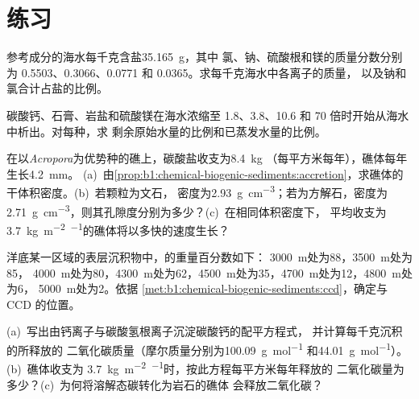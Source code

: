 \section{练习}

\begin{exercise}[$\star$]\label{exo:b1:chemical-biogenic-sediments:1}
参考成分的海水每千克含盐\qty{35.165}{g}，其中
氯、钠、硫酸根和镁的质量分数分别为
0.5503、0.3066、0.0771 和 0.0365。求每千克海水中各离子的质量，
以及钠和氯合计占盐的比例。
\end{exercise}

\begin{exercise}[$\star$]\label{exo:b1:chemical-biogenic-sediments:2}
碳酸钙、石膏、岩盐和硫酸镁在海水浓缩至
1.8、3.8、10.6 和 70 倍时开始从海水中析出。对每种，求
剩余原始水量的比例和已蒸发水量的比例。
\end{exercise}

\begin{exercise}[$\star$]\label{exo:b1:chemical-biogenic-sediments:3}
在以\emph{Acropora}为优势种的礁上，碳酸盐收支为\qty{8.4}{kg}
（每平方米每年），礁体每年生长\qty{4.2}{mm}。
(a)~由\cref{prop:b1:chemical-biogenic-sediments:accretion}，求礁体的
干体积密度。(b)~若颗粒为文石，
密度为\qty{2.93}{g.cm^{-3}}；若为方解石，密度为
\qty{2.71}{g.cm^{-3}}，则其孔隙度分别为多少？(c)~在相同体积密度下，
平均收支为\qty{3.7}{kg.m^{-2}.^{-1}}的礁体将以多快的速度生长？
\end{exercise}

\begin{exercise}[$\star$]\label{exo:b1:chemical-biogenic-sediments:4}
洋底某一区域的表层沉积物中，的重量百分数如下：
\qty{3000}{m}处为88，\qty{3500}{m}处为85，
\qty{4000}{m}处为80，\qty{4300}{m}处为62，\qty{4500}{m}处为35，\qty{4700}{m}处为12，\qty{4800}{m}处为6，
\qty{5000}{m}处为2。依据
\cref{met:b1:chemical-biogenic-sediments:ccd}，确定与 CCD 的位置。
\end{exercise}

\begin{exercise}[$\star\star$]\label{exo:b1:chemical-biogenic-sediments:5}
(a)~写出由钙离子与碳酸氢根离子沉淀碳酸钙的配平方程式，
并计算每千克沉积的所释放的
二氧化碳质量（摩尔质量分别为\qty{100.09}{g.mol^{-1}}
和\qty{44.01}{g.mol^{-1}}）。(b)~礁体收支为
\qty{3.7}{kg.m^{-2}.^{-1}}时，按此方程每平方米每年释放的
二氧化碳量为多少？(c)~为何将溶解态碳转化为岩石的礁体
会释放二氧化碳？
\end{exercise}

